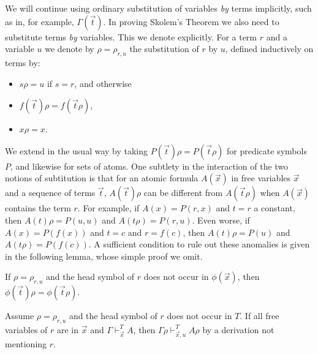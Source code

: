 \documentclass{fundam}
\begin{document}
We will continue using ordinary substitution of variables \emph{by} terms implicitly, 
such as in, for example, $\Gamma(\vec{t})$. 
In proving Skolem's Theorem we also need to
substitute terms \emph{by} variables. This we denote explicitly.
For a term $r$ and a variable $u$ we denote by $\rho = \rho_{r,u}$ the 
substitution of $r$ by $u$, defined inductively on terms by:
\begin{itemize}
\item $s\rho = u$ if $s = r$, and otherwise
\item $f(\vec{t})\rho = f(\vec{t}\rho)$,
\item $x\rho = x$.
\end{itemize}
We extend in the usual way by taking $P(\vec{t})\rho = P(\vec{t}\rho)$ for
predicate symbols  $P$, and likewise for sets of atoms. 
One subtlety in the interaction of the two notions of subtitution is that for an
atomic formula $A(\vec{x})$ in free variables $\vec{x}$ and
a sequence of terms $\vec{t}$, $A(\vec{t})\rho$
can be different from $A(\vec{t}\rho)$ when $A(\vec{x})$
contains the term $r$. For example, if  $A(x) = P(r,x)$
and $t=r$ a constant, then $A(t)\rho = P(u,u)$ and $A(t\rho) = P(r,u)$.
Even worse, if $A(x) = P(f(x))$ and $t=c$ and $r=f(c)$,
then $A(t)\rho = P(u)$ and $A(t\rho) = P(f(c))$.
A sufficient condition to rule out these anomalies is given in
the following lemma, whose simple proof we omit.

\begin{lemma}\label{subst0}
If $\rho = \rho_{r,u}$ and the head symbol of $r$ does not occur in 
$\phi(\vec{x})$, then $\phi(\vec{t})\rho =\phi(\vec{t}\rho)$.
\end{lemma}

\begin{lemma}\label{subst2}
Assume $\rho = \rho_{r,u}$ and the head symbol of $r$ does not occur in $T$.
If all free variables of $r$ are in $\vec{x}$ and $\Gamma\vdash_{\vec{x}}^T A$, then 
$\Gamma\rho\vdash_{\vec{x},u}^T A\rho$ by a derivation not mentioning $r$.
\end{lemma}
\end{document}
